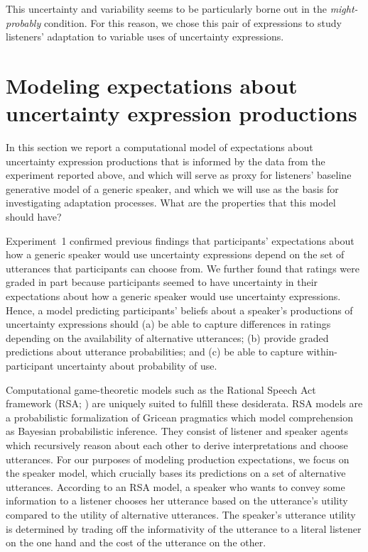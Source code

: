 \documentclass[man, floatsintext]{apa6}
\newcommand{\sectionref}[1]{Section~\ref{#1}}
\begin{document}
This uncertainty and variability seems to be particularly borne out in the \emph{might-probably} condition. For this reason, we chose this pair of expressions
to study listeners' adaptation to variable uses of uncertainty expressions.

\section{Modeling expectations about uncertainty expression productions}
\label{sec:model-baseline}


In this section we report a computational model of expectations about uncertainty expression productions that is informed by the data from the experiment reported above, and which will serve as proxy for listeners' baseline generative model of a generic speaker, and which we will use as the basis for investigating adaptation processes. What are the properties that this model should have?

Experiment~1 confirmed previous findings that participants' expectations 
about how a generic speaker would use uncertainty expressions 
depend on the set of utterances that participants can choose from.
We further found that ratings were graded in part because participants seemed to have uncertainty
in their expectations about how a generic speaker would use uncertainty expressions. 
Hence, a model predicting participants' beliefs about a speaker's productions of uncertainty expressions
 should  (a) be able to capture differences in ratings depending on the availability of alternative utterances; 
(b) provide graded predictions about utterance probabilities; 
and (c) be able to capture within-participant uncertainty about probability of use.

Computational game-theoretic models such as the Rational Speech Act 
framework (RSA; \cite{Goodman2016})  are uniquely suited to fulfill these desiderata.
RSA models are a probabilistic formalization of Gricean pragmatics which model comprehension as Bayesian probabilistic inference. 
They consist of listener and speaker agents which recursively reason about each other to derive interpretations and choose utterances. 
For our purposes of modeling production expectations, we focus on the speaker model, which crucially bases its predictions on a set of alternative utterances. 
  According to an RSA model, a speaker who wants to
 convey some information to a listener 
chooses her utterance based on the utterance's utility compared to the utility of alternative utterances. 
The speaker's utterance utility  is determined by trading off the informativity of the utterance to a literal listener on the one hand and the cost of the utterance on the other.
\end{document}
